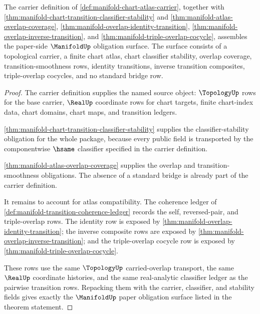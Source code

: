 \begin{theorem}
\label{thm:manifold-namecert-obligation-surface}
The carrier definition of
\autoref{def:manifold-chart-atlas-carrier}, together with
\autoref{thm:manifold-chart-transition-classifier-stability} and
\autoref{thm:manifold-atlas-overlap-coverage},
\autoref{thm:manifold-overlap-identity-transition},
\autoref{thm:manifold-overlap-inverse-transition}, and
\autoref{thm:manifold-triple-overlap-cocycle}, assembles the paper-side
$\ManifoldUp$ obligation surface. The surface consists of a topological carrier,
a finite chart atlas, chart classifier stability, overlap coverage,
transition-smoothness rows, identity transitions, inverse transition
composites, triple-overlap cocycles, and no standard bridge row.
\end{theorem}
\begin{proof}
The carrier definition supplies the named source object:
$\TopologyUp$ rows for the base carrier, $\RealUp$ coordinate rows for chart
targets, finite chart-index data, chart domains, chart maps, and transition
ledgers.

\autoref{thm:manifold-chart-transition-classifier-stability} supplies the
classifier-stability obligation for the whole package, because every public
field is transported by the componentwise $\hsame$ classifier specified in the
carrier definition.

\autoref{thm:manifold-atlas-overlap-coverage} supplies the overlap and
transition-smoothness obligations. The absence of a standard bridge is already
part of the carrier definition.

It remains to account for atlas compatibility. The coherence ledger of
\autoref{def:manifold-transition-coherence-ledger} records the self,
reversed-pair, and triple-overlap rows. The identity row is exposed by
\autoref{thm:manifold-overlap-identity-transition}; the inverse composite rows
are exposed by \autoref{thm:manifold-overlap-inverse-transition}; and the
triple-overlap cocycle row is exposed by
\autoref{thm:manifold-triple-overlap-cocycle}.

These rows use the same $\TopologyUp$ carried-overlap transport, the same
$\RealUp$ coordinate histories, and the same real-analytic classifier ledger as
the pairwise transition rows. Repacking them with the carrier, classifier, and
stability fields gives exactly the $\ManifoldUp$ paper obligation surface
listed in the theorem statement.
\end{proof}

